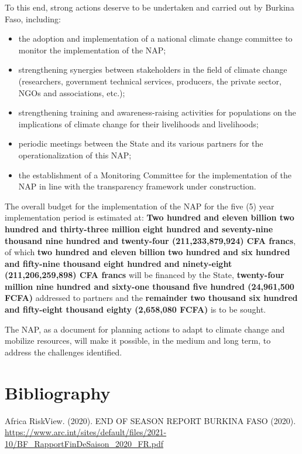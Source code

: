 \documentclass[
]{book}
\begin{document}
To this end, strong actions deserve to be undertaken and carried out by Burkina Faso, including:

\begin{itemize}
\item
  the adoption and implementation of a national climate change committee to monitor the implementation of the NAP;
\item
  strengthening synergies between stakeholders in the field of climate change (researchers, government technical services, producers, the private sector, NGOs and associations, etc.);
\item
  strengthening training and awareness-raising activities for populations on the implications of climate change for their livelihoods and livelihoods;
\item
  periodic meetings between the State and its various partners for the operationalization of this NAP;
\item
  the establishment of a Monitoring Committee for the implementation of the NAP in line with the transparency framework under construction.
\end{itemize}

The overall budget for the implementation of the NAP for the five (5) year implementation period is estimated at: \textbf{Two hundred and eleven billion two hundred and thirty-three million eight hundred and seventy-nine thousand nine hundred and twenty-four (211,233,879,924) CFA francs}, of which \textbf{two hundred and eleven billion two hundred and six hundred and fifty-nine thousand eight hundred and ninety-eight (211,206,259,898) CFA francs} will be financed by the State, \textbf{twenty-four million nine hundred and sixty-one thousand five hundred (24,961,500 FCFA)} addressed to partners and the \textbf{remainder two thousand six hundred and fifty-eight thousand eighty (2,658,080 FCFA)} is to be sought.

The NAP, as a document for planning actions to adapt to climate change and mobilize resources, will make it possible, in the medium and long term, to address the challenges identified.

\chapter*{Bibliography}\label{bibliography}

Africa RiskView. (2020). END OF SEASON REPORT \textbar{} BURKINA FASO (2020). \url{https://www.arc.int/sites/default/files/2021-10/BF_RapportFinDeSaison_2020_FR.pdf}
\end{document}
